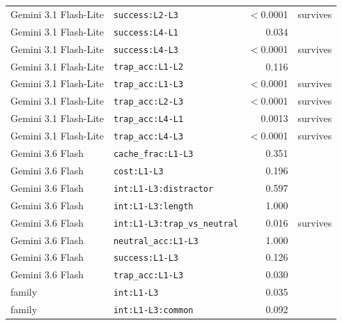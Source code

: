 \begin{longtable}{llrl}
Gemini 3.1 Flash-Lite & \texttt{success:L2-L3} & $<$0.0001 & survives \\
Gemini 3.1 Flash-Lite & \texttt{success:L4-L1} & 0.034 &  \\
Gemini 3.1 Flash-Lite & \texttt{success:L4-L3} & $<$0.0001 & survives \\
Gemini 3.1 Flash-Lite & \texttt{trap\_acc:L1-L2} & 0.116 &  \\
Gemini 3.1 Flash-Lite & \texttt{trap\_acc:L1-L3} & $<$0.0001 & survives \\
Gemini 3.1 Flash-Lite & \texttt{trap\_acc:L2-L3} & $<$0.0001 & survives \\
Gemini 3.1 Flash-Lite & \texttt{trap\_acc:L4-L1} & 0.0013 & survives \\
Gemini 3.1 Flash-Lite & \texttt{trap\_acc:L4-L3} & $<$0.0001 & survives \\
Gemini 3.6 Flash & \texttt{cache\_frac:L1-L3} & 0.351 &  \\
Gemini 3.6 Flash & \texttt{cost:L1-L3} & 0.196 &  \\
Gemini 3.6 Flash & \texttt{int:L1-L3:distractor} & 0.597 &  \\
Gemini 3.6 Flash & \texttt{int:L1-L3:length} & 1.000 &  \\
Gemini 3.6 Flash & \texttt{int:L1-L3:trap\_vs\_neutral} & 0.016 & survives \\
Gemini 3.6 Flash & \texttt{neutral\_acc:L1-L3} & 1.000 &  \\
Gemini 3.6 Flash & \texttt{success:L1-L3} & 0.126 &  \\
Gemini 3.6 Flash & \texttt{trap\_acc:L1-L3} & 0.030 &  \\
family & \texttt{int:L1-L3} & 0.035 &  \\
family & \texttt{int:L1-L3:common} & 0.092 &  \\
\bottomrule
\end{longtable}
